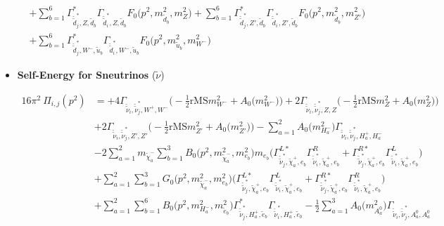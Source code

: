 \begin{itemize}
\begin{align}
 &+\sum_{b=1}^{6}{\Gamma^*_{\check{\tilde{d}}^*_{{j}},Z,\tilde{d}_{{b}}}} {\Gamma_{\check{\tilde{d}}^*_{{i}},Z,\tilde{d}_{{b}}}} {F_0\Big(p^{2},m^2_{\tilde{d}_{{b}}},m^2_{Z}\Big)} +\sum_{b=1}^{6}{\Gamma^*_{\check{\tilde{d}}^*_{{j}},{Z'},\tilde{d}_{{b}}}} {\Gamma_{\check{\tilde{d}}^*_{{i}},{Z'},\tilde{d}_{{b}}}} {F_0\Big(p^{2},m^2_{\tilde{d}_{{b}}},m^2_{{Z'}}\Big)} \nonumber \\ 
 &+\sum_{b=1}^{6}{\Gamma^*_{\check{\tilde{d}}^*_{{j}},W^-,\tilde{u}_{{b}}}} {\Gamma_{\check{\tilde{d}}^*_{{i}},W^-,\tilde{u}_{{b}}}} {F_0\Big(p^{2},m^2_{\tilde{u}_{{b}}},m^2_{W^-}\Big)}  
\end{align} 
\item {\bf Self-Energy for Sneutrinos} \thickspace (\(\tilde{\nu}\)) 

\begin{align} 
16\pi^2 \ \Pi_{i,j}(p^2) &= +4 {\Gamma_{\check{\tilde{\nu}}_{{i}},\check{\tilde{\nu}}^*_{{j}},W^+,W^-}} \Big(-\frac{1}{2} \text{rMS} m^2_{W^-}  + {A_0\Big(m^2_{W^-}\Big)}\Big)+2 {\Gamma_{\check{\tilde{\nu}}_{{i}},\check{\tilde{\nu}}^*_{{j}},Z,Z}} \Big(-\frac{1}{2} \text{rMS} m^2_{Z}  + {A_0\Big(m^2_{Z}\Big)}\Big)\nonumber \\ 
 &+2 {\Gamma_{\check{\tilde{\nu}}_{{i}},\check{\tilde{\nu}}^*_{{j}},{Z'},{Z'}}} \Big(-\frac{1}{2} \text{rMS} m^2_{{Z'}}  + {A_0\Big(m^2_{{Z'}}\Big)}\Big)- \sum_{a=1}^{2}{A_0\Big(m^2_{H^-_{{a}}}\Big)} {\Gamma_{\check{\tilde{\nu}}_{{i}},\check{\tilde{\nu}}^*_{{j}},H^+_{{a}},H^-_{{a}}}}  \nonumber \\ 
 &-2 \sum_{a=1}^{2}m_{\tilde{\chi}^-_{{a}}} \sum_{b=1}^{3}{B_0\Big(p^{2},m^2_{\tilde{\chi}^-_{{a}}},m^2_{e_{{b}}}\Big)} m_{e_{{b}}} \Big({\Gamma^{L*}_{\check{\tilde{\nu}}^*_{{j}},\tilde{\chi}^+_{{a}},e_{{b}}}} {\Gamma^R_{\check{\tilde{\nu}}^*_{{i}},\tilde{\chi}^+_{{a}},e_{{b}}}}  + {\Gamma^{R*}_{\check{\tilde{\nu}}^*_{{j}},\tilde{\chi}^+_{{a}},e_{{b}}}} {\Gamma^L_{\check{\tilde{\nu}}^*_{{i}},\tilde{\chi}^+_{{a}},e_{{b}}}} \Big)  \nonumber \\ 
 &+\sum_{a=1}^{2}\sum_{b=1}^{3}{G_0\Big(p^{2},m^2_{\tilde{\chi}^-_{{a}}},m^2_{e_{{b}}}\Big)} \Big({\Gamma^{L*}_{\check{\tilde{\nu}}^*_{{j}},\tilde{\chi}^+_{{a}},e_{{b}}}} {\Gamma^L_{\check{\tilde{\nu}}^*_{{i}},\tilde{\chi}^+_{{a}},e_{{b}}}}  + {\Gamma^{R*}_{\check{\tilde{\nu}}^*_{{j}},\tilde{\chi}^+_{{a}},e_{{b}}}} {\Gamma^R_{\check{\tilde{\nu}}^*_{{i}},\tilde{\chi}^+_{{a}},e_{{b}}}} \Big)\nonumber \\ 
 &+\sum_{a=1}^{2}\sum_{b=1}^{6}{B_0\Big(p^{2},m^2_{H^-_{{a}}},m^2_{\tilde{e}_{{b}}}\Big)} {\Gamma^*_{\check{\tilde{\nu}}^*_{{j}},H^+_{{a}},\tilde{e}_{{b}}}} {\Gamma_{\check{\tilde{\nu}}^*_{{i}},H^+_{{a}},\tilde{e}_{{b}}}} -\frac{1}{2} \sum_{a=1}^{3}{A_0\Big(m^2_{A^0_{{a}}}\Big)} {\Gamma_{\check{\tilde{\nu}}_{{i}},\check{\tilde{\nu}}^*_{{j}},A^0_{{a}},A^0_{{a}}}}  \nonumber \\ 

\end{align}
\end{itemize}
